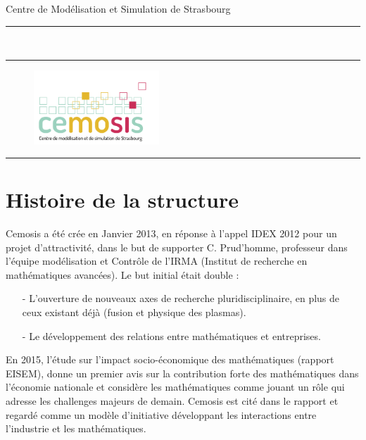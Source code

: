 \documentclass[12pt,a4paper]{article}
\newcommand{\HorRule}[1]{\noindent\rule{\linewidth}{#1}} %
\newcommand{\SepRule}{\noindent							 %
						\begin{center}
							\rule{250pt}{1pt}
						\end{center}
						}
\newcommand{\JournalName}[1]{%
		\begin{center}	
			\Huge 
			#1%
		\end{center}	
		\par \normalsize \normalfont}
\begin{document}

\JournalName{Centre de Mod\'elisation et Simulation de Strasbourg}
\noindent\HorRule{3pt} \\[-0.75\baselineskip]
\HorRule{1pt}


\vspace{0.5cm}
\begin{figure}[h]

\begin{center}


		\includegraphics[width=0.42\textwidth]{images/cemosis}
		\\	%


\end{center}
\end{figure}


\vspace{0.5cm}
	\SepRule
\vspace{0.5cm}

	\section*{Histoire de la structure}
 Cemosis a \'et\'e crée en Janvier 2013, en réponse à l'appel IDEX 2012 pour un projet d'attractivité, dans le but de supporter C. Prud'homme, professeur dans l'équipe modélisation et Contrôle de l'IRMA (Institut de recherche en mathématiques avancées). Le but initial était double : 
 \begin{itemize}
 	\item[-] L'ouverture de nouveaux axes de recherche pluridisciplinaire, en plus de ceux existant déjà (fusion et physique des plasmas).
 	\item[-] Le développement des relations entre mathématiques et entreprises.
 \end{itemize}
 
 En 2015, l'étude sur l'impact socio-économique des mathématiques (rapport EISEM), donne un premier avis sur la contribution forte des mathématiques dans l'économie nationale et considère les mathématiques comme jouant un rôle qui adresse les challenges majeurs de demain. Cemosis est cité dans le rapport et regardé comme un modèle d'initiative développant les interactions entre l'industrie et les mathématiques.
 
\end{document}
